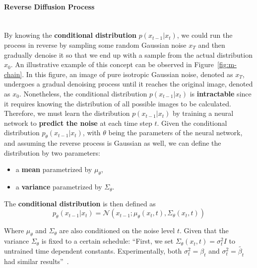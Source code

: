 \documentclass[preprint]{elsarticle}
\begin{document}
\paragraph{Reverse Diffusion Process}\mbox{}\\
By knowing the \textbf{conditional distribution} $p(x_{t-1}|x_t)$, we could run the process in reverse by sampling some random Gaussian noise $x_T$ and then gradually denoise it so that we end up with a sample from the actual distribution $x_0$.
An illustrative example of this concept can be observed in Figure~\ref{fig:m-chain}. In this figure, an image of pure isotropic Gaussian noise, denoted as $x_T$, undergoes a gradual denoising process until it reaches the original image, denoted as $x_0$.
Nonetheless, the conditional distribution $p(x_{t-1}|x_t)$ is \textbf{intractable} since it requires knowing the distribution of all possible images to be calculated.
Therefore, we must learn the distribution $p(x_{t-1}|x_t)$ by training a neural network to \textbf{predict the noise} at each time step $t$. Given the conditional distribution $p_\theta(x_{t-1}|x_t)$, 
with $\theta$ being the parameters of the neural network, and assuming the reverse process is Gaussian as well, we can define the distribution by two parameters:

\begin{itemize}
	\item a \textbf{mean} parametrized by $\mu_\theta$,
	\item a \textbf{variance} parametrized by $\Sigma_\theta$.
\end{itemize}
The \textbf{conditional distribution} is then defined as
\begin{equation}
	p_\theta(x_{t-1}|x_t) = \mathcal{N}(x_{t-1}; \mu_\theta(x_t,t), \Sigma_\theta(x_t,t))
\end{equation}

Where $\mu_\theta$ and $\Sigma_\theta$ are also conditioned on the noise level $t$.
Given that the variance $\Sigma_\theta$ is fixed to a certain schedule: ``First, we set $\Sigma_\theta(x_t,t)=\sigma_t^2I$ to untrained time dependent constants. Experimentally, both $\sigma_t^2=\beta_t$ and $\sigma_t^2=\tilde{\beta_t}$ had similar results''~\cite{ho2020denoising}.
\end{document}
